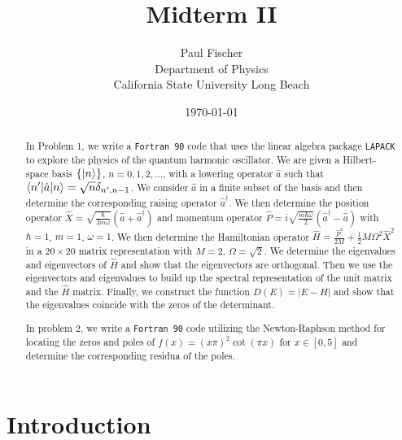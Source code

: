 \documentclass[12pt]{article}
\begin{document}

\title{Midterm II}
\author{Paul Fischer \\
Department of Physics\\
California State University Long Beach}
\date{\today }

\maketitle

\begin{abstract}

In Problem 1, we write a {\tt Fortran 90} code that uses the linear algebra package {\tt LAPACK} to explore the physics of the quantum harmonic oscillator.  We are given a Hilbert-space basis $\{\ket{n}\}$, $n=0,1,2,...$, with a lowering operator $\hat{a}$ such that $\braket{n'|\hat{a}|n}=\sqrt{n}\delta_{n',n-1}$.  We consider $\hat{a}$ in a finite subset of the basis and then determine the corresponding raising operator $\hat{a}^\dagger$.  We then determine the position operator $\hat{X}=\sqrt{\frac{\hbar}{2m\omega}}(\hat{a}+\hat{a}^\dagger)$ and momentum operator $\hat{P}=i\sqrt{\frac{m\hbar\omega}{2}}(\hat{a}^\dagger-\hat{a})$ with $\hbar=1$, $m=1$, $\omega=1$.  We then determine the Hamiltonian operator $\hat{H}=\frac{\hat{P}^2}{2M}+\frac{1}{2}M\Omega^2\hat{X}^2$ in a $20 \times 20$ matrix representation with $M=2$, $\Omega=\sqrt{2}$.  We determine the eigenvalues and eigenvectors of $\hat{H}$ and show that the eigenvectors are orthogonal.  Then we use the eigenvectors and eigenvalues to build up the spectral representation of the unit matrix and the $\hat{H}$ matrix.  Finally, we construct the function $D(E)=|E-H|$ and show that the eigenvalues coincide with the zeros of the determinant.  

In problem 2, we write a {\tt Fortran 90} code utilizing the Newton-Raphson method for locating the zeros and poles of $f(x)=(x\pi)^2\cot(\pi x)$ for $x \in [0,5]$ and determine the corresponding residua of the poles.

\end{abstract}

\section{Introduction}
\end{document}
